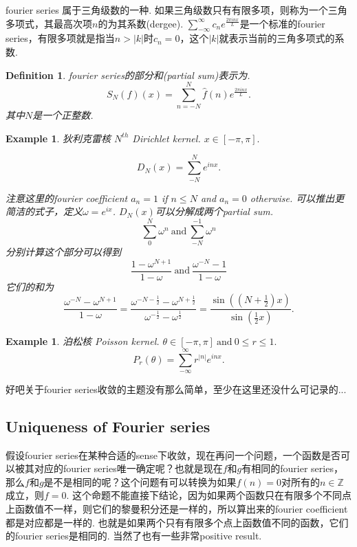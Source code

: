 \documentclass{article}
\newtheorem{example}[theorem]{Example}
\newtheorem{definition}[theorem]{Definition}
\begin{document}
fourier series 属于三角级数的一种. 如果三角级数只有有限多项，则称为一个三角多项式，其最高次项$n$的为其系数(dergee). $\sum\limits_{-\infty}^{\infty} c_n e^{\frac{2\pi inx}{L}}$是一个标准的fourier series，有限多项就是指当$n > |k|$时$c_n = 0$，这个$|k|$就表示当前的三角多项式的系数.
 
 
\begin{definition}
\rm fourier series的部分和(partial sum)表示为.
$$
S_N(f)(x) = \sum\limits_{n=-N}^{N} \widehat{f}(n) e^{\frac{2\pi inx}{L}}.
$$
其中$N$是一个正整数.
\end{definition}

\begin{example}
\rm 狄利克雷核 $N^{th}$ Dirichlet kernel. $x \in [-\pi,\pi].$

$$
D_N(x) = \sum\limits_{-N}^{N} e^{inx}.
$$ 

注意这里的fourier coefficient $a_n = 1$ if $n \leq N$ and $a_n = 0$ otherwise. 可以推出更简洁的式子，定义$\omega = e^{ix}$. $D_N(x)$可以分解成两个partial sum.
$$
	\sum\limits_{0}^{N} \omega^n\ \text{and}\ \sum\limits_{-N}^{-1} \omega^n 
$$
分别计算这个部分可以得到
$$
	\frac{1-\omega^{N+1}}{1-\omega}\ \text{and}\ \frac{\omega^{-N}-1}{1-\omega}
$$
它们的和为
$$
\frac{\omega^{-N}-\omega^{N+1}}{1-\omega} =  \frac{\omega^{-N-\frac12}-\omega^{N+\frac12}}{\omega^{-\frac12}-\omega^{\frac12}} = \frac{\sin((N+\frac12)x)}{\sin(\frac12x)}.
$$
\end{example}

\begin{example}
\rm 泊松核 Poisson kernel. $\theta \in [-\pi,\pi]\ \text{and}\ 0 \leq r \leq 1.$
$$
P_r(\theta) = \sum\limits_{-\infty}^{\infty} r^{|n|}e^{inx}.
$$
\end{example}

好吧关于fourier series收敛的主题没有那么简单，至少在这里还没什么可记录的...

\subsection{Uniqueness of Fourier series}
假设fourier series在某种合适的sense下收敛，现在再问一个问题，一个函数是否可以被其对应的fourier series唯一确定呢？也就是现在$f$和$g$有相同的fourier series，那么$f$和$g$是不是相同的呢？这个问题有可以转换为如果$\widehat{f}(n)=0$对所有的$n \in \mathbb{Z}$成立，则$f=0$. 这个命题不能直接下结论，因为如果两个函数只在有限多个不同点上函数值不一样，则它们的黎曼积分还是一样的，所以算出来的fourier coefficient都是对应都是一样的. 也就是如果两个只有有限多个点上函数值不同的函数，它们的fourier series是相同的. 当然了也有一些非常positive result.
\end{document}
